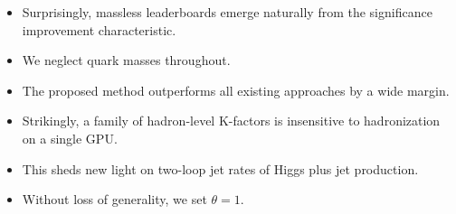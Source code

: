 \begin{itemize}
  \item Surprisingly, massless leaderboards emerge naturally from the significance improvement characteristic.
  \item We neglect quark masses throughout.
  \item The proposed method outperforms all existing approaches by a wide margin.
\end{itemize}

\begin{itemize}
  \item Strikingly, a family of hadron-level K-factors is insensitive to hadronization on a single GPU.
  \item This sheds new light on two-loop jet rates of Higgs plus jet production.
  \item Without loss of generality, we set $\theta = 1$.
\end{itemize}

